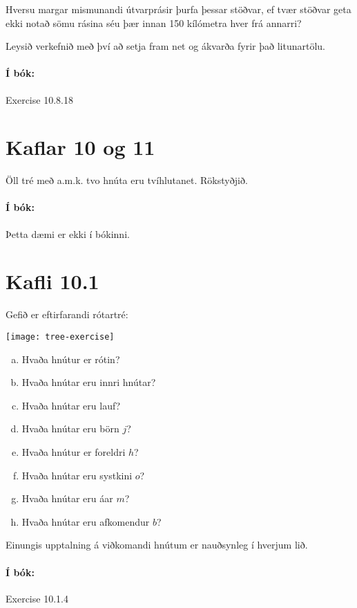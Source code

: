 \documentclass{exam}
\begin{document}
\begin{questions}
\begin{center}
\end{center}
Hversu margar mismunandi útvarprásir þurfa þessar stöðvar, ef tvær stöðvar geta ekki notað sömu rásina séu þær innan 150 kílómetra hver frá annarri?

Leysið verkefnið með því að setja fram net og ákvarða fyrir það litunartölu.

\paragraph{Í bók:} Exercise 10.8.18

\section{Kaflar 10 og 11}

\question Öll tré með a.m.k. tvo hnúta eru tvíhlutanet. Rökstyðjið.

\paragraph{Í bók:} Þetta dæmi er ekki í bókinni.

\section{Kafli 10.1}

\question Gefið er eftirfarandi rótartré:

\begin{center}
\texttt{[image: tree-exercise]}
\end{center}

\begin{enumerate}[a)]
 \item Hvaða hnútur er rótin?
 \item Hvaða hnútar eru innri hnútar?
 \item Hvaða hnútar eru lauf?
 \item Hvaða hnútar eru börn $j$?
 \item Hvaða hnútur er foreldri $h$?
 \item Hvaða hnútar eru systkini $o$?
 \item Hvaða hnútar eru áar $m$?
 \item Hvaða hnútar eru afkomendur $b$?
\end{enumerate}
Einungis upptalning á viðkomandi hnútum er nauðsynleg í hverjum lið.

\paragraph{Í bók:} Exercise 10.1.4


\end{questions}
\end{document}

